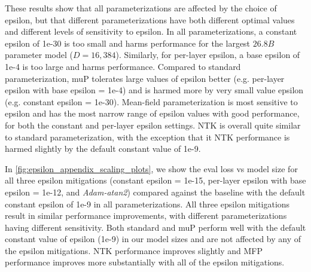 These results show that all parameterizations are affected by the choice of epsilon, but that different parameterizations have both different optimal values and different levels of sensitivity to epsilon. In all parameterizations, a constant epsilon of 1e-30 is too small and harms performance for the largest $26.8B$ parameter model ($D = 16{,}384$). Similarly, for per-layer epsilon, a base epsilon of 1e-4 is too large and harms performance. Compared to standard parameterization, muP tolerates large values of epsilon better (e.g. per-layer epsilon with base epsilon = 1e-4) and is harmed more by very small value epsilon (e.g. constant epsilon = 1e-30). Mean-field parameterization is most sensitive to epsilon and has the most narrow range of epsilon values with good performance, for both the constant and per-layer epsilon settings. NTK is overall quite similar to standard parameterization, with the exception that it NTK performance is harmed slightly by the default constant value of 1e-9.

In \cref{fig:epsilon_appendix_scaling_plots}, we show the eval loss vs model size for all three epsilon mitigations (constant epsilon = 1e-15, per-layer epsilon with base epsilon = 1e-12, and \emph{Adam-atan2}) compared against the baseline with the default constant epsilon of 1e-9 in all parameterizations. All three epsilon mitigations result in similar performance improvements, with different parameterizations having different sensitivity. Both standard and muP perform well with the default constant value of epsilon (1e-9) in our model sizes and are not affected by any of the epsilon mitigations. NTK performance improves slightly and MFP performance improves more substantially with all of the epsilon mitigations.


